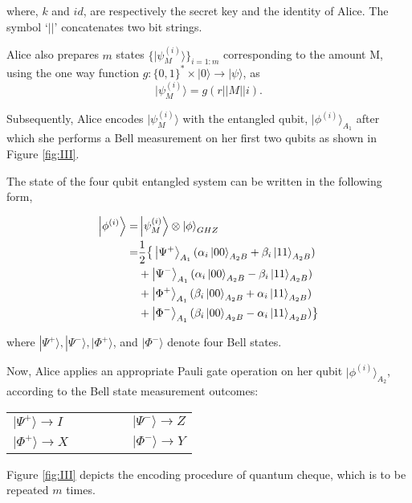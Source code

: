 \documentclass[aps,pra,twocolumn,groupedaddress,showpacs,showkeys]{revtex4-1}
\begin{document}
where, $k$ and $id$, are respectively the secret key and the identity of Alice. The symbol `$||$' concatenates two bit strings.

Alice also prepares $m$ states $\{|\psi_M^{(i)} \rangle \}_{i=1:m}$ corresponding to the amount M, using the one way function $g: \{0,1\}^* \times |0\rangle \rightarrow |\psi\rangle$, as $$ |\psi_M^{(i)}\rangle = g(r || M || i). $$ 

Subsequently, Alice encodes \cite{HBB99} $|\psi_M^{(i)} \rangle$ with the entangled qubit, $|\phi^{(i)}\rangle_{A_1}$ after which she performs a Bell measurement on her first two qubits as shown in Figure \ref{fig:III}.  

The state of the four qubit entangled system can be written in the following form,

\begin{eqnarray}
\label{eq:1}
	\begin{split}
	\Ket{\phi^{(i)}} =		& 	  \Ket{\psi_M^{(i)}} \otimes \Ket{\phi}_{GHZ} \\
			=		&	 \frac{1}{2} \big\{ \Ket{ \Psi^{+}}_{A_1} (\alpha_i \Ket{00}_{A_2B} + \beta_i \Ket{11}_{A_2B}) \\
					&	+ \Ket{\Psi^{-}}_{A_1} (\alpha_i \Ket{00}_{A_2B} - \beta_i \Ket{11}_{A_2B}) \\	
					&	+ \Ket{\Phi^{+}}_{A_1} (\beta_i \Ket{00}_{A_2B} + \alpha_i \Ket{11}_{A_2B}) \\  
					&	+ \Ket{\Phi^{-}}_{A_1} (\beta_i \Ket{00}_{A_2B} - \alpha_i \Ket{11}_{A_2B}) \big\}
	\end{split}
\end{eqnarray}

where $|\Psi^{+}\rangle, |\Psi^{-}\rangle, |\Phi^{+}\rangle$, and $|\Phi^{-}\rangle$ denote four Bell states. 

Now, Alice applies an appropriate Pauli gate operation on her qubit $|\phi^{(i)}\rangle_{A_2}$, according to the Bell state measurement outcomes:

\begin{center}
	\begin{tabular}{ l c*{4}    l }
		$|\Psi^{+}\rangle  \rightarrow I$ 			& & & & &	$|\Psi^{-}\rangle \rightarrow Z$ 	\\
		$| \Phi^{+}\rangle \rightarrow X$	& & & & &	$|\Phi^{-}\rangle \rightarrow Y$	\\
	\end{tabular}
\end{center}

Figure \ref{fig:III} depicts the encoding procedure of quantum cheque, which is to be repeated $m$ times.
\end{document}
